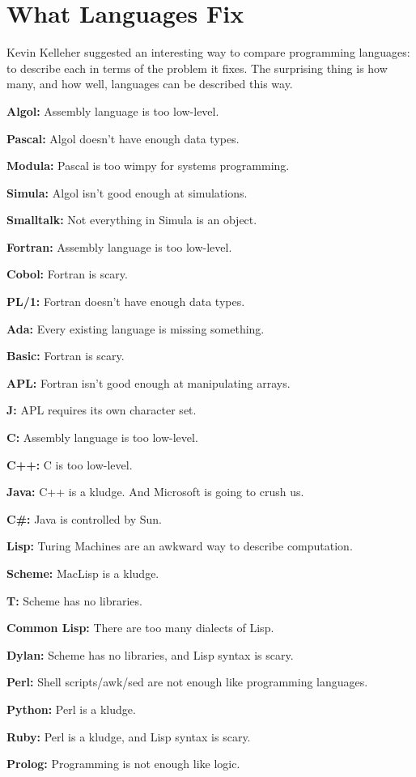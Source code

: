 \chapter{What Languages Fix}

Kevin Kelleher suggested an interesting way to compare programming
languages: to describe each in terms of the problem it fixes. The
surprising thing is how many, and how well, languages can be described
this way.

\textbf{Algol:} Assembly language is too low-level.

\textbf{Pascal:} Algol doesn't have enough data types.

\textbf{Modula:} Pascal is too wimpy for systems programming.

\textbf{Simula:} Algol isn't good enough at simulations.

\textbf{Smalltalk:} Not everything in Simula is an object.

\textbf{Fortran:} Assembly language is too low-level.

\textbf{Cobol:} Fortran is scary.

\textbf{PL/1:} Fortran doesn't have enough data types.

\textbf{Ada:} Every existing language is missing something.

\textbf{Basic:} Fortran is scary.

\textbf{APL:} Fortran isn't good enough at manipulating arrays.

\textbf{J:} APL requires its own character set.

\textbf{C:} Assembly language is too low-level.

\textbf{C++:} C is too low-level.

\textbf{Java:} C++ is a kludge. And Microsoft is going to crush us.

\textbf{C\#:} Java is controlled by Sun.

\textbf{Lisp:} Turing Machines are an awkward way to describe
computation.

\textbf{Scheme:} MacLisp is a kludge.

\textbf{T:} Scheme has no libraries.

\textbf{Common Lisp:} There are too many dialects of Lisp.

\textbf{Dylan:} Scheme has no libraries, and Lisp syntax is scary.

\textbf{Perl:} Shell scripts/awk/sed are not enough like programming
languages.

\textbf{Python:} Perl is a kludge.

\textbf{Ruby:} Perl is a kludge, and Lisp syntax is scary.

\textbf{Prolog:} Programming is not enough like logic.